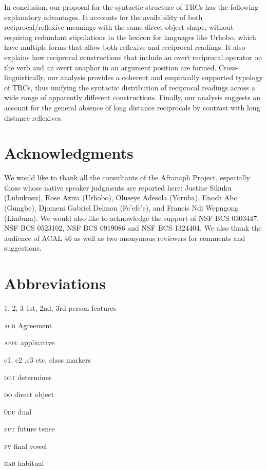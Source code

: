 \documentclass[output=paper]{langsci/langscibook}
\begin{document}
In conclusion, our proposal for the syntactic structure of TRCs has the following explanatory advantages. It accounts for the availability of both reciprocal/reflexive meanings with the same direct object shape, without requiring redundant stipulations in the lexicon for languages like Urhobo, which have multiple forms that allow both reflexive and reciprocal readings. It also explains how reciprocal constructions that include an overt reciprocal operator on the verb and an overt anaphor in an argument position are formed. Cross-linguistically, our analysis provides a coherent and empirically supported typology of TRCs, thus unifying the syntactic distribution of reciprocal readings across a wide range of apparently different constructions. Finally, our analysis suggests an account for the general absence of long distance reciprocals by contrast with long distance reflexives.

\section*{Acknowledgments}

We would like to thank all the consultants of the Afranaph Project, especially those whose native speaker judgments are reported here: Justine Sikuku (Lubukusu), Rose Aziza (Urhobo), Oluseye Adesola (Yoruba), Enoch Abo (Gungbe), Djomeni Gabriel Delmon (Fe'efe'e), and Francis Ndi Wepngong (Limbum). We would also like to acknowledge the support of NSF BCS 0303447, NSF BCS 0523102, NSF BCS 0919086 and NSF BCS 1324404. We also thank the audience of ACAL 46 as well as two anonymous reviewers for comments and suggestions.  

\section*{Abbreviations}

\textsc{1, 2, 3}    1st, 2nd, 3rd person features

\textsc{agr}    Agreement

\textsc{appl}    applicative

c1, c2 ,c3 etc.  class markers

\textsc{det}    determiner

\textsc{do}    direct object

0\textsc{du}    dual

\textsc{fut}    future tense

\textsc{fv}    final vowel

\textsc{hab}    habitual
\end{document}
